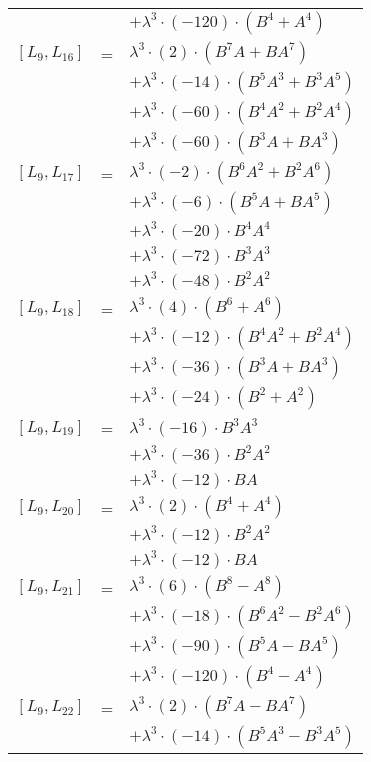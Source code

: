 \documentclass{article}
\begin{document}
\begin{center}
\begin{longtable}{lll}
 & & $ + {\lambda}^3{\cdot}(-120){\cdot}(B^{4}+A^{4})$ \\
$[L_{9},L_{16}]$ & = & ${\lambda}^3{\cdot}(2){\cdot}(B^{7}A+BA^{7})$ \\*
 & & $ + {\lambda}^3{\cdot}(-14){\cdot}(B^{5}A^{3}+B^{3}A^{5})$ \\*
 & & $ + {\lambda}^3{\cdot}(-60){\cdot}(B^{4}A^{2}+B^{2}A^{4})$ \\*
 & & $ + {\lambda}^3{\cdot}(-60){\cdot}(B^{3}A+BA^{3})$ \\
$[L_{9},L_{17}]$ & = & ${\lambda}^3{\cdot}(-2){\cdot}(B^{6}A^{2}+B^{2}A^{6})$ \\*
 & & $ + {\lambda}^3{\cdot}(-6){\cdot}(B^{5}A+BA^{5})$ \\*
 & & $ + {\lambda}^3{\cdot}(-20){\cdot}B^{4}A^{4}$ \\*
 & & $ + {\lambda}^3{\cdot}(-72){\cdot}B^{3}A^{3}$ \\*
 & & $ + {\lambda}^3{\cdot}(-48){\cdot}B^{2}A^{2}$ \\
$[L_{9},L_{18}]$ & = & ${\lambda}^3{\cdot}(4){\cdot}(B^{6}+A^{6})$ \\*
 & & $ + {\lambda}^3{\cdot}(-12){\cdot}(B^{4}A^{2}+B^{2}A^{4})$ \\*
 & & $ + {\lambda}^3{\cdot}(-36){\cdot}(B^{3}A+BA^{3})$ \\*
 & & $ + {\lambda}^3{\cdot}(-24){\cdot}(B^{2}+A^{2})$ \\
$[L_{9},L_{19}]$ & = & ${\lambda}^3{\cdot}(-16){\cdot}B^{3}A^{3}$ \\*
 & & $ + {\lambda}^3{\cdot}(-36){\cdot}B^{2}A^{2}$ \\*
 & & $ + {\lambda}^3{\cdot}(-12){\cdot}BA$ \\
$[L_{9},L_{20}]$ & = & ${\lambda}^3{\cdot}(2){\cdot}(B^{4}+A^{4})$ \\*
 & & $ + {\lambda}^3{\cdot}(-12){\cdot}B^{2}A^{2}$ \\*
 & & $ + {\lambda}^3{\cdot}(-12){\cdot}BA$ \\
$[L_{9},L_{21}]$ & = & ${\lambda}^3{\cdot}(6){\cdot}(B^{8}-A^{8})$ \\*
 & & $ + {\lambda}^3{\cdot}(-18){\cdot}(B^{6}A^{2}-B^{2}A^{6})$ \\*
 & & $ + {\lambda}^3{\cdot}(-90){\cdot}(B^{5}A-BA^{5})$ \\*
 & & $ + {\lambda}^3{\cdot}(-120){\cdot}(B^{4}-A^{4})$ \\
$[L_{9},L_{22}]$ & = & ${\lambda}^3{\cdot}(2){\cdot}(B^{7}A-BA^{7})$ \\*
 & & $ + {\lambda}^3{\cdot}(-14){\cdot}(B^{5}A^{3}-B^{3}A^{5})$ \\*

\end{longtable}
\end{center}
\end{document}
